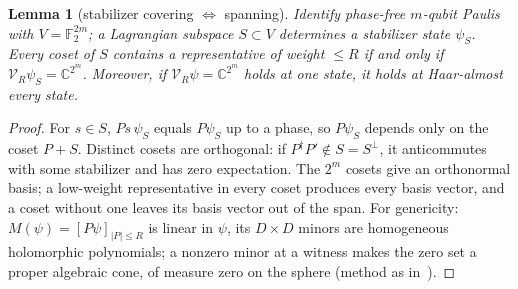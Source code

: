 \documentclass[aps,pra,onecolumn,superscriptaddress,nofootinbib,longbibliography,10pt]{revtex4-2}
\newtheorem{lemma}{Lemma}
\theoremstyle{definition}
\newcommand{\CC}{\mathbb C}
\newcommand{\FF}{\mathbb F}
\begin{document}
\begin{lemma}[stabilizer covering $\Leftrightarrow$ spanning]\label{lem:2}
Identify phase-free $m$-qubit Paulis with $V=\FF_2^{2m}$; a Lagrangian subspace $S\subset V$ determines a stabilizer state $\psi_S$. Every coset of $S$ contains a representative of weight $\le R$ if and only if $\mathcal V_R\psi_S=\CC^{2^m}$. Moreover, if $\mathcal V_R\psi=\CC^{2^m}$ holds at one state, it holds at Haar-almost every state.
\end{lemma}
\begin{proof}
For $s\in S$, $Ps\,\psi_S$ equals $P\psi_S$ up to a phase, so $P\psi_S$ depends only on the coset $P+S$. Distinct cosets are orthogonal: if $P^\dagger P'\notin S=S^\perp$, it anticommutes with some stabilizer and has zero expectation. The $2^m$ cosets give an orthonormal basis; a low-weight representative in every coset produces every basis vector, and a coset without one leaves its basis vector out of the span. For genericity: $M(\psi)=[P\psi]_{|P|\le R}$ is linear in $\psi$, its $D\times D$ minors are homogeneous holomorphic polynomials; a nonzero minor at a witness makes the zero set a proper algebraic cone, of measure zero on the sphere (method as in~\cite{KJTV17}).
\end{proof}
\end{document}

